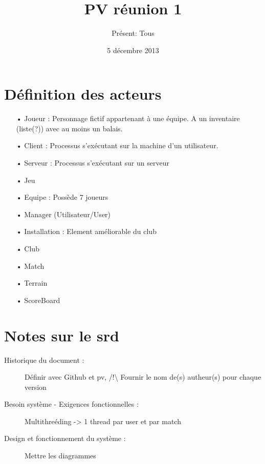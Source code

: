 \documentclass[a4paper,10pt]{article}
\author{Présent: Tous}
\title{PV réunion 1}
\date{5 décembre 2013}
\begin{document}
\maketitle
\part*{Définition des acteurs}
\begin{enumerate}
\item[•] Joueur : Personnage fictif appartenant à une équipe. A un inventaire (liste(?)) avec au moins un balais.
\item[•] Client : Processus s'exécutant sur la machine d'un utilisateur.
\item[•] Serveur : Processus s'exécutant sur un serveur
\item[•] Jeu
\item[•] Equipe : Possède 7 joueurs
\item[•] Manager (Utilisateur/User)
\item[•] Installation : Element améliorable du club
\item[•] Club
\item[•] Match
\item[•] Terrain
\item[•] ScoreBoard
\end{enumerate}
\part*{Notes sur le srd}
\begin{description}
\item[Historique du document : ]Définir avec Github et pv, /!\textbackslash{} Fournir le nom de(s) autheur(s) pour chaque version
\item[Besoin système - Exigences fonctionnelles : ]Multithreéding -> 1 thread par user et par match
\item[Design et fonctionnement du système : ]Mettre les diagrammes
\end{description}
\end{document}
